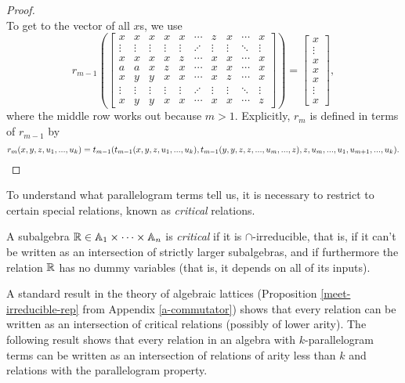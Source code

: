 \documentclass[letterpaper,11pt]{article}
\begin{document}
\begin{proof}
\[\]
To get to the vector of all $x$s, we use
\[
r_{m-1}\left(\begin{bmatrix} x & x & x & x & x & \cdots & z & x & \cdots & x\\ \vdots & \vdots & \vdots & \vdots & \vdots & \iddots & \vdots & \vdots & \ddots & \vdots \\ x & x & x & x & z & \cdots & x & x & \cdots & x\\ a & a & x & z & x & \cdots & x & x & \cdots & x\\ x & y & y & x & x & \cdots & x & z & \cdots & x\\ \vdots & \vdots & \vdots & \vdots & \vdots & \iddots & \vdots & \vdots & \ddots & \vdots \\ x & y & y & x & x & \cdots & x & x & \cdots & z\end{bmatrix}\right) = \begin{bmatrix} x\\ \vdots \\ x\\ x\\ x\\ \vdots \\ x\end{bmatrix},
\]
where the middle row works out because $m > 1$. Explicitly, $r_{m}$ is defined in terms of $r_{m-1}$ by
\[
r_{m}(x,y,z,u_1,...,u_k) = t_{m-1}(t_{m-1}(x,y,z,u_1,...,u_k),t_{m-1}(y,y,z,z,...,u_{m},...,z),z,u_{m},...,u_1,u_{m+1},...,u_k).\qedhere
\]
\end{proof}

To understand what parallelogram terms tell us, it is necessary to restrict to certain special relations, known as \emph{critical} relations.

\begin{defn} A subalgebra $\mathbb{R} \in \mathbb{A}_1 \times \cdots \times \mathbb{A}_n$ is \emph{critical} if it is $\cap$-irreducible, that is, if it can't be written as an intersection of strictly larger subalgebras, and if furthermore the relation $\mathbb{R}$ has no dummy variables (that is, it depends on all of its inputs).
\end{defn}

A standard result in the theory of algebraic lattices (Proposition \ref{meet-irreducible-rep} from Appendix \ref{a-commutator}) shows that every relation can be written as an intersection of critical relations (possibly of lower arity). The following result shows that every relation in an algebra with $k$-parallelogram terms can be written as an intersection of relations of arity less than $k$ and relations with the parallelogram property.
\end{document}
